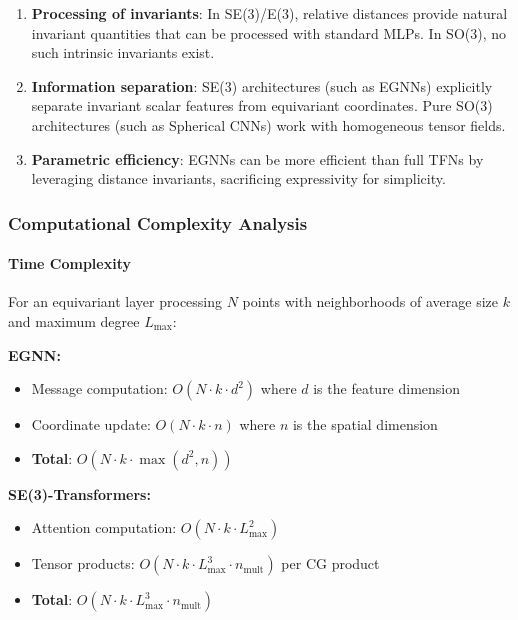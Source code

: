 \begin{enumerate}
    \item \textbf{Processing of invariants}: In SE(3)/E(3), relative distances provide natural invariant quantities that can be processed with standard MLPs. In SO(3), no such intrinsic invariants exist.

    \item \textbf{Information separation}: SE(3) architectures (such as EGNNs) explicitly separate invariant scalar features from equivariant coordinates. Pure SO(3) architectures (such as Spherical CNNs) work with homogeneous tensor fields.

    \item \textbf{Parametric efficiency}: EGNNs can be more efficient than full TFNs by leveraging distance invariants, sacrificing expressivity for simplicity.
\end{enumerate}

\subsubsection{Computational Complexity Analysis}

\paragraph{Time Complexity}

For an equivariant layer processing $N$ points with neighborhoods of average size $k$ and maximum degree $L_{\max}$:

\textbf{EGNN:}
\begin{itemize}
    \item Message computation: $O(N \cdot k \cdot d^2)$ where $d$ is the feature dimension
    \item Coordinate update: $O(N \cdot k \cdot n)$ where $n$ is the spatial dimension
    \item \textbf{Total}: $O(N \cdot k \cdot \max(d^2, n))$
\end{itemize}

\textbf{SE(3)-Transformers:}
\begin{itemize}
    \item Attention computation: $O(N \cdot k \cdot L_{\max}^2)$
    \item Tensor products: $O(N \cdot k \cdot L_{\max}^3 \cdot n_{\text{mult}})$ per CG product
    \item \textbf{Total}: $O(N \cdot k \cdot L_{\max}^3 \cdot n_{\text{mult}})$
\end{itemize}

